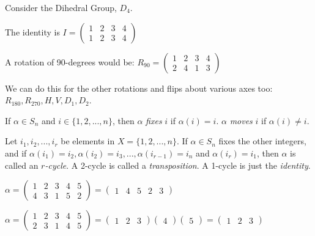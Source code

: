 \begin{ex}
	Consider the Dihedral Group, $D_4$.
	\begin{center}
	\end{center}
	The identity is $I = \left( \begin{matrix}
	1&2&3&4\\
	1&2&3&4
	\end{matrix} \right)$
	
	\begin{center}
	\end{center}
	\noindent A rotation of 90-degrees would be: $R_{90} = \left( \begin{matrix}
	1&2&3&4\\
	2&4&1&3
	\end{matrix} \right)$
	
	\noindent We can do this for the other rotations and flips about various axes too: $R_{180}, R_{270}, H, V, D_1, D_2$.
\end{ex}

\begin{defn}
	If $\alpha \in S_n$ and $i \in \{1, 2,..., n \}$, then $\alpha$ \emph{fixes} $i$ if $\alpha(i) = i$.  $\alpha$ \emph{moves} $i$ if $\alpha(i) \neq i$.
\end{defn}

\begin{defn}
	Let $i_1, i_2, ..., i_r$ be elements in $X = \{1, 2, ..., n\}$.  If $\alpha \in S_n$ fixes the other integers, and if $\alpha(i_1) = i_2, \alpha(i_2) = i_3, ..., \alpha(i_{r-1}) = i_n$ and $\alpha(i_r) = i_1$, then $\alpha$ is called an \emph{$r$-cycle}.  A 2-cycle is called a \emph{transposition}.  A 1-cycle is just the \emph{identity}.
\end{defn}

\begin{ex}
	$\alpha = \left( \begin{matrix}
	1&2&3&4&5\\
	4&3&1&5&2
	\end{matrix} \right) =
	\left( \begin{matrix}
	1&4&5&2&3
	\end{matrix} \right)$
\end{ex}

\begin{ex}
	$\alpha = \left( \begin{matrix}
	1&2&3&4&5\\
	2&3&1&4&5
	\end{matrix} \right) =
	\left( \begin{matrix}
	1&2&3
	\end{matrix} \right)
	\left( \begin{matrix}
	4
	\end{matrix} \right)
	\left( \begin{matrix}
	5
	\end{matrix} \right) =
	\left( \begin{matrix}
	1&2&3
	\end{matrix} \right)$
\end{ex}

